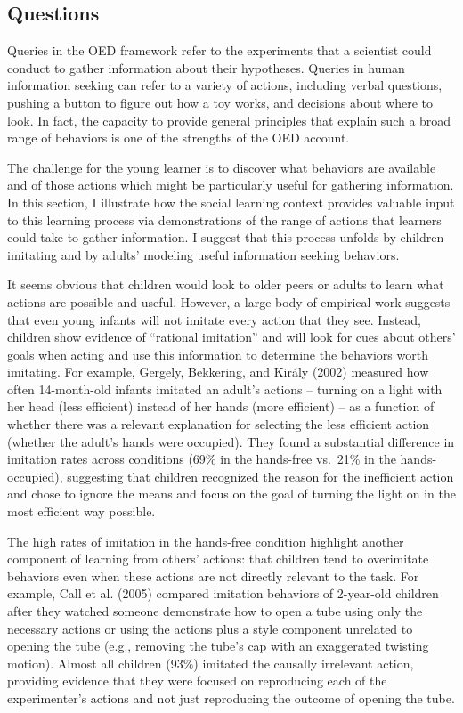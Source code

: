 \documentclass[english,floatsintext,man]{apa6}
\theoremstyle{definition}
\theoremstyle{definition}
\theoremstyle{definition}
\theoremstyle{remark}
\begin{document}
\subsection{Questions}\label{questions}

Queries in the OED framework refer to the experiments that a scientist
could conduct to gather information about their hypotheses. Queries in
human information seeking can refer to a variety of actions, including
verbal questions, pushing a button to figure out how a toy works, and
decisions about where to look. In fact, the capacity to provide general
principles that explain such a broad range of behaviors is one of the
strengths of the OED account.

The challenge for the young learner is to discover what behaviors are
available and of those actions which might be particularly useful for
gathering information. In this section, I illustrate how the social
learning context provides valuable input to this learning process via
demonstrations of the range of actions that learners could take to
gather information. I suggest that this process unfolds by children
imitating and by adults' modeling useful information seeking behaviors.

It seems obvious that children would look to older peers or adults to
learn what actions are possible and useful. However, a large body of
empirical work suggests that even young infants will not imitate every
action that they see. Instead, children show evidence of
\enquote{rational imitation} and will look for cues about others' goals
when acting and use this information to determine the behaviors worth
imitating. For example, Gergely, Bekkering, and Király (2002) measured
how often 14-month-old infants imitated an adult's actions -- turning on
a light with her head (less efficient) instead of her hands (more
efficient) -- as a function of whether there was a relevant explanation
for selecting the less efficient action (whether the adult's hands were
occupied). They found a substantial difference in imitation rates across
conditions (69\% in the hands-free vs.~21\% in the hands-occupied),
suggesting that children recognized the reason for the inefficient
action and chose to ignore the means and focus on the goal of turning
the light on in the most efficient way possible.

The high rates of imitation in the hands-free condition highlight
another component of learning from others' actions: that children tend
to overimitate behaviors even when these actions are not directly
relevant to the task. For example, Call et al. (2005) compared imitation
behaviors of 2-year-old children after they watched someone demonstrate
how to open a tube using only the necessary actions or using the actions
plus a style component unrelated to opening the tube (e.g., removing the
tube's cap with an exaggerated twisting motion). Almost all children
(93\%) imitated the causally irrelevant action, providing evidence that
they were focused on reproducing each of the experimenter's actions and
not just reproducing the outcome of opening the tube.
\end{document}
